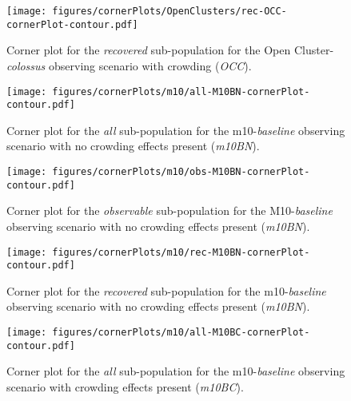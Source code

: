 \documentclass[twocolumn]{aastex63}
\begin{document}
\begin{figure}
    \centering
    \texttt{[image: figures/cornerPlots/OpenClusters/rec-OCC-cornerPlot-contour.pdf]}
    \caption{Corner plot for the \textit{recovered} sub-population for the Open Cluster-\textit{colossus} observing scenario with crowding (\textit{OCC}).}
    \label{fig:occ-Rec-corner-plot-appendix}
\end{figure}\clearpage

\begin{figure}
    \centering
    \texttt{[image: figures/cornerPlots/m10/all-M10BN-cornerPlot-contour.pdf]}
    \caption{Corner plot for the \textit{all} sub-population for the m10-\textit{baseline} observing scenario with no crowding effects present (\textit{m10BN}).}
    \label{fig:m10bn-All-corner-plot-appendix}
\end{figure}\clearpage

\begin{figure}
    \centering
    \texttt{[image: figures/cornerPlots/m10/obs-M10BN-cornerPlot-contour.pdf]}
    \caption{Corner plot for the \textit{observable} sub-population for the M10-\textit{baseline} observing scenario with no crowding effects present (\textit{m10BN}).}
    \label{fig:m10bn-Obs-corner-plot-appendix}
\end{figure}\clearpage

\begin{figure}
    \centering
    \texttt{[image: figures/cornerPlots/m10/rec-M10BN-cornerPlot-contour.pdf]}
    \caption{Corner plot for the \textit{recovered} sub-population for the m10-\textit{baseline} observing scenario with no crowding effects present (\textit{m10BN}).}
    \label{fig:m10bn-Rec-corner-plot-appendix}
\end{figure}\clearpage

\begin{figure}
    \centering
    \texttt{[image: figures/cornerPlots/m10/all-M10BC-cornerPlot-contour.pdf]}
    \caption{Corner plot for the \textit{all} sub-population for the m10-\textit{baseline} observing scenario with crowding effects present (\textit{m10BC}).}
    \label{fig:m10bc-All-corner-plot-appendix}
\end{figure}\clearpage
\end{document}

